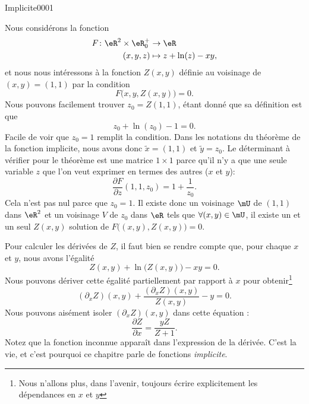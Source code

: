 
\begin{corrige}{Implicite0001}

	Nous considérons la fonction
	\begin{equation}
		\begin{aligned}
			F\colon \eR^2\times \eR_0^+&\to \eR \\
			(x,y,z)&\mapsto z+\ln(z)-xy, 
		\end{aligned}
	\end{equation}
	et nous nous intéressons à la fonction $Z(x,y)$ définie au voisinage de $(x,y)=(1,1)$ par la condition
	\begin{equation}
		F\big( x,y,Z(x,y) \big)=0.
	\end{equation}
	Nous pouvons facilement trouver $z_0=Z(1,1)$, étant donné que sa définition est que
	\begin{equation}
		z_0+\ln(z_0)-1=0.
	\end{equation}
	Facile de voir que $z_0=1$ remplit la condition. Dans les notations du théorème de la fonction implicite, nous avons donc $\tilde x=(1,1)$ et $\tilde y=z_0$. Le déterminant à vérifier pour le théorème est une matrice $1\times 1$ parce qu'il n'y a que une seule variable $z$ que l'on veut exprimer en termes des autres ($x$ et $y$):
	\begin{equation}
		\frac{ \partial F }{ \partial z }(1,1,z_0)=1+\frac{1}{ z_0 }.
	\end{equation}
	Cela n'est pas nul parce que $z_0=1$. Il existe donc un voisinage $\mU$ de $(1,1)$ dans $\eR^2$ et un voisinage $V$ de $z_0$ dans $\eR$ tels que $\forall (x,y)\in\mU$, il existe un et un seul $Z(x,y)$ solution de $F\big( (x,y),Z(x,y) \big)=0$.

	Pour calculer les dérivées de $Z$, il faut bien se rendre compte que, pour chaque $x$ et $y$, nous avons l'égalité
	\begin{equation}
		Z(x,y)+\ln\big( Z(x,y) \big)-xy=0.
	\end{equation}
	Nous pouvons dériver cette égalité partiellement par rapport à $x$ pour obtenir\footnote{Nous n'allons plus, dans l'avenir, toujours écrire explicitement les dépendances en $x$ et $y$}
	\begin{equation}		\label{EqPartialXZexoI}
		(\partial_xZ)(x,y)+\frac{ (\partial_xZ)(x,y) }{ Z(x,y) }-y=0.
	\end{equation}
	Nous pouvons aisément isoler $(\partial_xZ)(x,y)$ dans cette équation :
	\begin{equation}
		\frac{ \partial Z }{ \partial x }=\frac{ yZ }{ Z+1 }.
	\end{equation}
	Notez que la fonction \og inconnue\fg{} apparaît dans l'expression de la dérivée. C'est la vie, et c'est pourquoi ce chapitre parle de fonctions \emph{implicite}.


\end{corrige}
